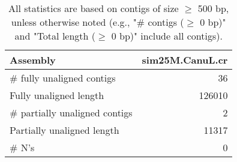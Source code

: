 \documentclass[12pt,a4paper]{article}
\begin{document}
\begin{table}[ht]
\begin{center}
\caption{All statistics are based on contigs of size $\geq$ 500 bp, unless otherwise noted (e.g., "\# contigs ($\geq$ 0 bp)" and "Total length ($\geq$ 0 bp)" include all contigs).}
\begin{tabular}{|l*{1}{|r}|}
\hline
Assembly & sim25M.CanuL.cr \\ \hline
\# fully unaligned contigs & 36 \\ \hline
Fully unaligned length & 126010 \\ \hline
\# partially unaligned contigs & 2 \\ \hline
Partially unaligned length & 11317 \\ \hline
\# N's & 0 \\ \hline
\end{tabular}
\end{center}
\end{table}
\end{document}
